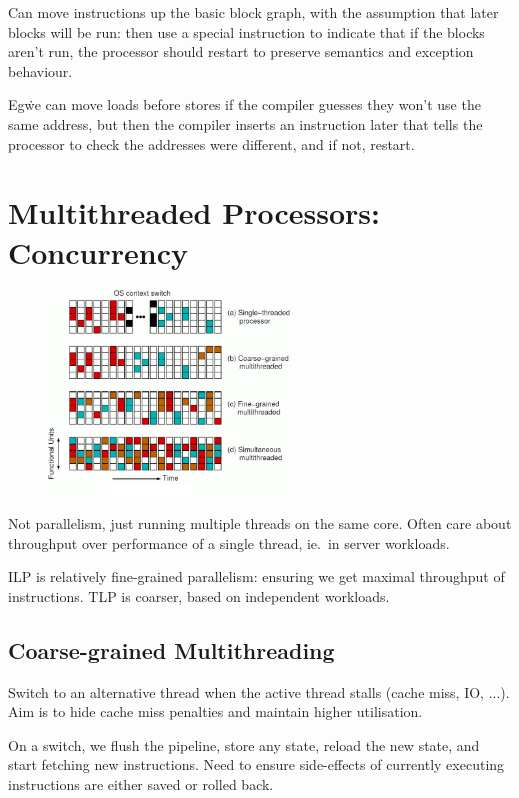 \documentclass[a4paper, 11pt]{article}
\begin{document}
{{        Can move instructions up the basic block graph, with the assumption that later blocks will be run: then use a special instruction to indicate that if the blocks aren't run, the processor should restart to preserve semantics and exception behaviour.

        Eg\. we can move loads before stores if the compiler guesses they won't use the same address, but then the compiler inserts an instruction later that tells the processor to check the addresses were different, and if not, restart.
    }
}
\section*{Multithreaded Processors: \textbf{Concurrency}}
{
    \begin{figure}
    \centering
    \includegraphics[width=0.57\textwidth]{multithreading-summary.png}
    \end{figure}
    
    Not parallelism, just running multiple threads on the same core. Often care about throughput over performance of a single thread, ie.\ in server workloads.

    ILP is relatively fine-grained parallelism: ensuring we get maximal throughput of instructions. TLP is coarser, based on independent workloads.

    \subsection*{Coarse-grained Multithreading}
    {
        Switch to an alternative thread when the active thread stalls (cache miss, IO, ...). Aim is to hide cache miss penalties and maintain higher utilisation.

        On a switch, we flush the pipeline, store any state, reload the new state, and start fetching new instructions. Need to ensure side-effects of currently executing instructions are either saved or rolled back.

}}
\end{document}
